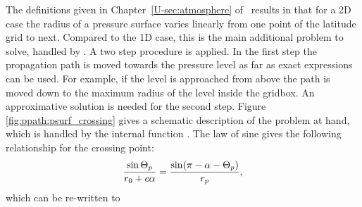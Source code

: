 The definitions given in Chapter~\ref{U-sec:atmosphere} of \user\ results in
that for a 2D case the radius of a pressure surface varies linearly from one
point of the latitude grid to next. Compared to the 1D case, this is the main
additional problem to solve, handled by . A two
step procedure is applied. In the first step the propagation path is moved
towards the pressure level as far as exact expressions can be used. For
example, if the level is approached from above the path is moved down to the
maximum radius of the level inside the gridbox. An approximative solution is
needed for the second step. Figure \ref{fig:ppath:psurf_crossing} gives a
schematic description of the problem at hand, which is handled by the internal
function .
The law of sine gives the following relationship for the crossing
point:
\begin{equation}
  \frac{\sin\Theta_p}{r_{0}+c\alpha} = 
                                \frac{\sin(\pi-\alpha-\Theta_p)}{r_{p}},
\end{equation}
which can be re-written to

